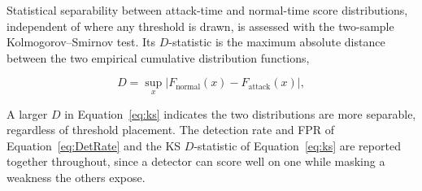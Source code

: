 Statistical separability between attack-time and normal-time score distributions, independent of where any threshold is drawn, is assessed with the two-sample Kolmogorov--Smirnov test. Its $D$-statistic is the maximum absolute distance between the two empirical cumulative distribution functions,

\begin{equation}
\label{eq:ks}
D = \sup_{x} \left| F_{\text{normal}}(x) - F_{\text{attack}}(x) \right|,
\end{equation}

A larger $D$ in Equation~\eqref{eq:ks} indicates the two distributions are more separable, regardless of threshold placement. The detection rate and FPR of Equation~\eqref{eq:DetRate} and the KS $D$-statistic of Equation~\eqref{eq:ks} are reported together throughout, since a detector can score well on one while masking a weakness the others expose.
